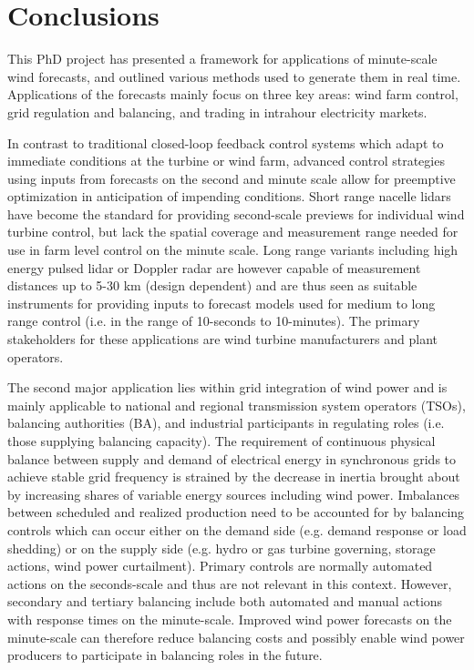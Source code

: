 \chapter{Conclusions}
\label{sec:conclusions}

\clearpage

This PhD project has presented a framework for applications of minute-scale wind forecasts, and outlined various methods used to generate them in real time. Applications of the forecasts mainly focus on three key areas: wind farm control, grid regulation and balancing, and trading in intrahour electricity markets. 

In contrast to traditional closed-loop feedback control systems which adapt to immediate conditions at the turbine or wind farm, advanced control strategies using inputs from forecasts on the second and minute scale allow for preemptive optimization in anticipation of impending conditions. Short range nacelle lidars have become the standard for providing second-scale previews for individual wind turbine control, but lack the spatial coverage and measurement range needed for use in farm level control on the minute scale. Long range variants including high energy pulsed lidar or Doppler radar are however capable of measurement distances up to 5-30 km (design dependent) and are thus seen as suitable instruments for providing inputs to forecast models used for medium to long range control (i.e. in the range of 10-seconds to 10-minutes). The primary stakeholders for these applications are wind turbine manufacturers and plant operators.

The second major application lies within grid integration of wind power and is mainly applicable to national and regional transmission system operators (TSOs), balancing authorities (BA), and industrial participants in regulating roles (i.e. those supplying balancing capacity). The requirement of continuous physical balance between supply and demand of electrical energy in synchronous grids to achieve stable grid frequency is strained by the decrease in inertia brought about by increasing shares of variable energy sources including wind power. Imbalances between scheduled and realized production need to be accounted for by balancing controls which can occur either on the demand side (e.g. demand response or load shedding) or on the supply side (e.g. hydro or gas turbine governing, storage actions, wind power curtailment). Primary controls are normally automated actions on the seconds-scale and thus are not relevant in this context. However, secondary and tertiary balancing include both automated and manual actions with response times on the minute-scale. Improved wind power forecasts on the minute-scale can therefore reduce balancing costs and possibly enable wind power producers to participate in balancing roles in the future.

